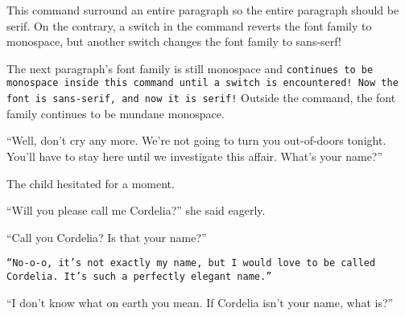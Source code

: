 \documentclass[a4paper]{article}
\begin{document}
\textrm{This command surround an entire paragraph so the entire paragraph should be serif. \ttfamily On the contrary, a switch in the command reverts the font family to monospace, \sffamily but another switch changes the font family to sans-serf!}

The next paragraph's font family is still monospace and \texttt{continues to be monospace inside this command until a switch is encountered! \sffamily Now the font is sans-serif, \rmfamily and now it is serif!} Outside the command, the font family continues to be mundane monospace.


``Well, don't cry any more. \textsf{We're not going to turn you out-of-doors tonight. \rmfamily You'll have to stay here until we investigate this affair.} What's your name?''

\textrm{The child hesitated \ttfamily for a moment.}

\textrm{``Will you please call me Cordelia?'' \sffamily she said eagerly.}

``Call you Cordelia? Is that your name?''

\texttt{``No-o-o, it's not exactly my name, \sffamily but I would love to be called Cordelia. \rmfamily It's such a perfectly elegant name.''}

``I don't know what on earth you mean. If Cordelia isn't your name, what is?''
\end{document}

